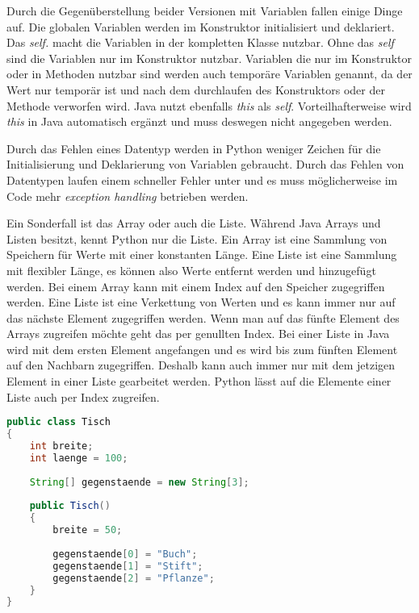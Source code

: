 Durch die Gegenüberstellung beider Versionen mit Variablen fallen einige Dinge auf. Die globalen Variablen werden im Konstruktor initialisiert und deklariert. Das \textit{self.} macht die Variablen in der kompletten Klasse nutzbar. Ohne das \textit{self} sind die Variablen nur im Konstruktor nutzbar. Variablen die nur im Konstruktor oder in Methoden nutzbar sind werden auch temporäre Variablen genannt, da der Wert nur temporär ist und nach dem durchlaufen des Konstruktors oder der Methode verworfen wird. Java nutzt ebenfalls \textit{this} als \textit{self}. Vorteilhafterweise wird \textit{this} in Java automatisch ergänzt und muss deswegen nicht angegeben werden. 
\par
Durch das Fehlen eines Datentyp werden in Python weniger Zeichen für die Initialisierung und Deklarierung von Variablen gebraucht. Durch das Fehlen von Datentypen laufen einem schneller Fehler unter und es muss möglicherweise im Code mehr \textit{exception handling} betrieben werden.
\par
Ein Sonderfall ist das Array oder auch die Liste. Während Java Arrays und Listen besitzt, kennt Python nur die Liste. Ein Array ist eine Sammlung von Speichern für Werte mit einer konstanten Länge. Eine Liste ist eine Sammlung mit flexibler Länge, es können also Werte entfernt werden und hinzugefügt werden. Bei einem Array kann mit einem Index auf den Speicher zugegriffen werden. Eine Liste ist eine Verkettung von Werten und es kann immer nur auf das nächste Element zugegriffen werden. Wenn man auf das fünfte Element des Arrays zugreifen möchte geht das per genullten Index. Bei einer Liste in Java wird mit dem ersten Element angefangen und es wird bis zum fünften Element auf den Nachbarn zugegriffen. Deshalb kann auch immer nur mit dem jetzigen Element in einer Liste gearbeitet werden. Python lässt auf die Elemente einer Liste auch per Index zugreifen. \cite{Louis:2010}\cite{Python3:Buch}

\begin{lstlisting}[language=java,caption={Array in Java},captionpos=b,label={lst:java:array},frame=none]
public class Tisch
{
    int breite;
    int laenge = 100;
  
    String[] gegenstaende = new String[3];
  
    public Tisch()
    {
        breite = 50;
    
        gegenstaende[0] = "Buch";
        gegenstaende[1] = "Stift";
        gegenstaende[2] = "Pflanze";
    }
}
\end{lstlisting}

